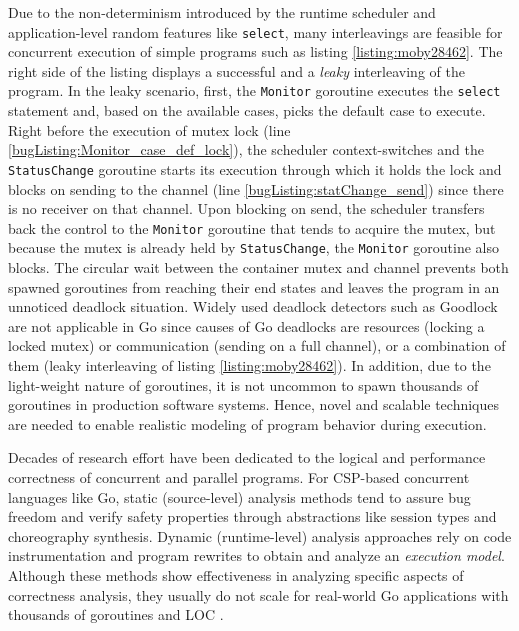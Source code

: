 Due to the non-determinism introduced by the runtime scheduler and application-level random features like \texttt{select}, many interleavings are feasible for concurrent execution of simple programs such as listing \ref{listing:moby28462}.
%
The right side of the listing displays a successful and a \textit{leaky} interleaving of the program.
%
In the leaky scenario, first, the \texttt{Monitor} goroutine executes the \texttt{select} statement and, based on the available cases, picks the default case to execute.
%
Right before the execution of mutex lock (line \ref{bugListing:Monitor_case_def_lock}), the scheduler context-switches and the \texttt{StatusChange} goroutine starts its execution through which it holds the lock and blocks on sending to the channel (line \ref{bugListing:statChange_send}) since there is no receiver on that channel.
%
Upon blocking on send, the scheduler transfers back the control to the \texttt{Monitor} goroutine that tends to acquire the mutex, but because the mutex is already held by \texttt{StatusChange}, the \texttt{Monitor} goroutine also blocks.
%
The circular wait between the container mutex and channel prevents both spawned goroutines from reaching their end states and leaves the program in an unnoticed deadlock situation.
%
Widely used deadlock detectors such as Goodlock \cite{havelund-goodlock-spin00} are not applicable in Go since causes of Go deadlocks are resources (\eg locking a locked mutex) or communication (\eg sending on a full channel), or a combination of them (\eg leaky interleaving of listing \ref{listing:moby28462}).
%
In addition, due to the light-weight nature of goroutines, it is not uncommon to spawn thousands of goroutines in production software systems.
%
Hence,  novel and scalable techniques are needed to enable realistic modeling of program behavior during execution.
%

Decades of research effort have been dedicated to the logical and performance correctness of concurrent and parallel programs.
%
For CSP-based concurrent languages like Go, static (source-level) analysis methods \cite{ng-dl-cc16,lange-fence-popl17,lange-staticType-icse18} tend to assure bug freedom and verify safety properties through abstractions like session types and choreography synthesis.
%
Dynamic (runtime-level) analysis approaches \cite{go-race-blog,sulzmann-twophase-2018,dilley-gomela-corr2020} rely on code instrumentation and program rewrites to obtain and analyze an \textit{execution model}.
%
Although these methods show effectiveness in analyzing specific aspects of correctness analysis, they usually do not scale for real-world Go applications with thousands of goroutines and LOC \cite{dilley-empirical-saner19}.

